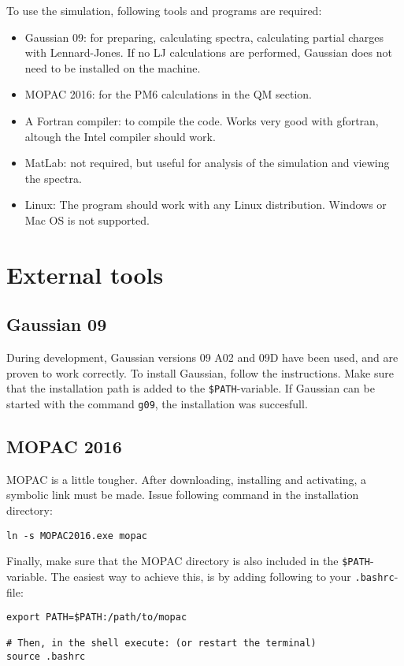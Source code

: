 To use the simulation, following tools and programs are required:
\begin{itemize}
	\item Gaussian 09: for preparing, calculating spectra, calculating partial 
	charges with Lennard-Jones. If no LJ calculations are performed, Gaussian 
	does not need to be installed on the machine.
	\item MOPAC 2016: for the PM6 calculations in the QM section.
	\item A Fortran compiler: to compile the code. Works very good with 
	gfortran, altough the Intel compiler should work.
	\item MatLab: not required, but useful for analysis of the simulation and 
	viewing the spectra.
	\item Linux: The program should work with any Linux distribution. Windows 
	or Mac OS is not supported.
\end{itemize}

\section{External tools}
\subsection{Gaussian 09}
During development, Gaussian versions 09 A02 and 09D have been used, and are 
proven to work correctly.
To install Gaussian, follow the instructions. Make sure that the installation 
path is added to the \verb|$PATH|-variable. If Gaussian can be started with the 
command \verb|g09|, the installation was succesfull.

\subsection{MOPAC 2016}
MOPAC is a little tougher. After downloading, installing and activating, a 
symbolic link must be made. Issue following command in the installation 
directory:

\begin{lstlisting}[caption=Symlink to MOPAC]
ln -s MOPAC2016.exe mopac
\end{lstlisting}

Finally, make sure that the MOPAC directory is also included in the 
\verb|$PATH|-variable. The easiest way to achieve this, is by adding following 
to your \verb|.bashrc|-file:
\begin{lstlisting}[caption=changing the path variable]
export PATH=$PATH:/path/to/mopac

# Then, in the shell execute: (or restart the terminal)
source .bashrc
\end{lstlisting}

